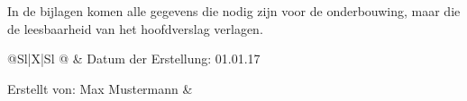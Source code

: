 



In de bijlagen komen alle gegevens die nodig zijn voor de
onderbouwing, maar die de leesbaarheid van het hoofdverslag verlagen.


\sffamily
\begin{tabularx}{\textwidth}{@{}Sl|X|Sl @{}}
	\mytoprule
	& Datum der Erstellung: 01.01.17 \par\mbox{}\par Erstellt von: Max Mustermann
	&  \\
	\mymidrule
	 \\
	\addlinespace
	 \\
	\midrule
	 \\
\end{tabularx}
